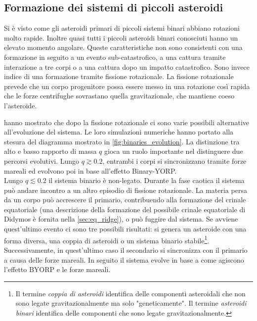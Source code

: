 \documentclass[a4paper,11pt,openright]{book}
\begin{document}
\subsection{Formazione dei sistemi di piccoli asteroidi}
Si è visto come gli asteroidi primari di piccoli sistemi binari abbiano rotazioni molto rapide. Inoltre quasi tutti i piccoli asteroidi binari conosciuti hanno un elevato momento angolare. Queste caratteristiche non sono consistenti con una formazione in seguito a un evento sub-catastrofico, a una cattura tramite interazione a tre corpi o a una cattura dopo un impatto catastrofico. Sono invece indice di una formazione tramite fissione rotazionale. La fissione rotazionale prevede che un corpo progenitore possa essere messo in una rotazione così rapida che le forze centrifughe sovrastano quella gravitazionale, che mantiene coeso l'asteroide.

\citet{jacobson_dynamics_2011} hanno mostrato che dopo la fissione rotazionale ci sono varie possibili alternative all'evoluzione del sistema. Le loro simulazioni numeriche hanno portato alla stesura del diagramma mostrato in \cref{fig:binaries_evolution}. La distinzione tra alto e basso rapporto di massa $q$ gioca un ruolo importante nel distinguere due percorsi evolutivi. Lungo $q\gtrsim0.2$, entrambi i corpi si sincronizzano tramite forze mareali ed evolvono poi in base all'effetto Binary-YORP.\\
Lungo $q\lesssim0.2$ il sistema binario è non-legato. Durante la fase caotica il sistema può andare incontro a un altro episodio di fissione rotazionale. La materia persa da un corpo può accrescere il primario, contribuendo alla formazione del crinale equatoriale (una descrizione della formazione del possibile crinale equatoriale di Didymos è fornita nella \cref{sec:eq_ridge}), o può fuggire dal sistema. Se avviene quest'ultimo evento ci sono tre possibili risultati: si genera un asteroide con una forma diversa, una coppia di asteroidi o un sistema binario stabile\footnote{Il termine \textit{coppia di asteroidi} identifica delle componenti asteroidali che non sono legate gravitazionalmente ma solo "geneticamente". Il termine \textit{asteroidi binari} identifica delle componenti che sono legate gravitazionalmente.}. Successivamente, in quest'ultimo caso il secondario si sincronizza con il primario a causa delle forze mareali. In seguito il sistema evolve in base a come agiscono l'effetto BYORP e le forze mareali.
\end{document}
